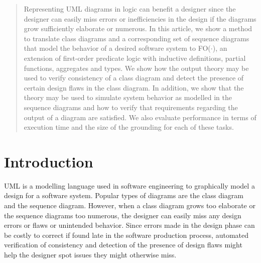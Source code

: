 \documentclass[conference]{IEEEtran}
\begin{document}
\begin{abstract}
Representing UML diagrams in logic can benefit a designer since the designer can easily miss errors or inefficiencies in the design if the diagrams grow sufficiently elaborate or numerous. In this article, we show a method to translate class diagrams and a corresponding set of sequence diagrams that model the behavior of a desired software system to FO($\cdot$), an extension of first-order predicate logic with inductive definitions, partial functions, aggregates and types. We show how the output theory may be used to verify consistency of a class diagram and detect the presence of certain design flaws in the class diagram. In addition, we show that the theory may be used to simulate system behavior as modelled in the sequence diagrams and how to verify that requirements regarding the output of a diagram are satisfied. We also evaluate performance in terms of execution time and the size of the grounding for each of these tasks.
\end{abstract}





%
\IEEEpeerreviewmaketitle



\section{Introduction}
UML\cite{RumbaughJames2005Tuml} is a modelling language used in software engineering to graphically model a design for a software system. Popular types of diagrams are the class diagram and the sequence diagram. However, when a class diagram grows too elaborate or the sequence diagrams too numerous, the designer can easily miss any design errors or flaws or unintended behavior. Since errors made in the design phase can be costly to correct if found late in the software production process, automated verification of consistency and detection of the presence of design flaws might help the designer spot issues they might otherwise miss.
\end{document}
